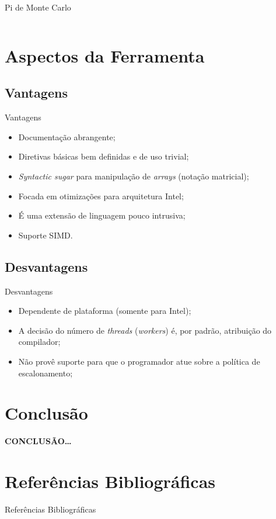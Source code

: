 \documentclass{beamer}
\begin{document}
\begin{frame}{Pi de Monte Carlo}
\begin{columns}
\end{columns}
\end{frame}

\section{Aspectos da Ferramenta}
\subsection{Vantagens}
\begin{frame}{Vantagens}
\begin{itemize}
	\item Documentação abrangente;
    \item Diretivas básicas bem definidas e de uso trivial;
    \item \textit{Syntactic sugar} para manipulação de \textit{arrays} (notação matricial);
    \item Focada em otimizações para arquitetura Intel;
    \item É uma extensão de linguagem pouco intrusiva;
    \item Suporte SIMD.
\end{itemize}
\end{frame}

\subsection{Desvantagens}
\begin{frame}{Desvantagens}
\begin{itemize}
    \item Dependente de plataforma (somente para Intel);
	\item A decisão do número de \textit{threads} (\textit{workers}) é, por padrão, atribuição do compilador;
	\item Não provê suporte para que o programador atue sobre a política de escalonamento;
\end{itemize}

\end{frame}

\section{Conclusão}
\begin{frame}[plain]
\begin{center}
\huge \textbf{CONCLUSÃO\ldots}
\end{center}
\end{frame}

\section{Referências Bibliográficas}
\begin{frame}{Referências Bibliográficas}
\nocite{*}
\tiny{}

\end{frame}
\end{document}
